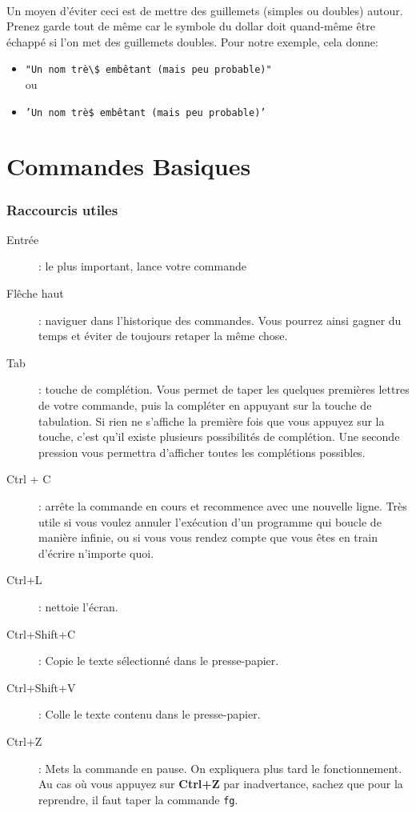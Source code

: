 \documentclass[french, a4paper, 12pt, titlepage]{article}
\begin{document}
\paragraph{} Un moyen d'éviter ceci est de mettre des guillemets (simples ou
doubles) autour. Prenez garde tout de même car le symbole du dollar doit
quand-même être échappé si l'on met des guillemets doubles. Pour notre exemple,
cela donne:
\\
\begin{itemize}
	\item \texttt{"Un nom trè\textbackslash\$ embêtant (mais peu probable)"}\\
	ou
	\item \texttt{'Un nom trè\$ embêtant (mais peu probable)'}
\end{itemize}

\newpage
\part{Commandes Basiques}

\section{Raccourcis utiles}

\begin{description}
	\item[Entrée]: le plus important, lance votre commande
	\item[Flêche haut]: naviguer dans l'historique des commandes. Vous pourrez
		ainsi gagner du temps et éviter de toujours retaper la même chose.
	\item[Tab]: touche de complétion. Vous permet de taper les quelques
		premières lettres de votre commande, puis la compléter en appuyant sur
		la touche de tabulation. Si rien ne s'affiche la première fois que vous
		appuyez sur la touche, c'est qu'il existe plusieurs possibilités de
		complétion. Une seconde pression vous permettra d'afficher toutes les
		complétions possibles.
	\item[Ctrl + C]: arrête la commande en cours et recommence avec une
		nouvelle ligne. Très utile si vous voulez annuler l'exécution d'un
		programme qui boucle de manière infinie, ou si vous vous rendez compte
		que vous êtes en train d'écrire n'importe quoi.
	\item[Ctrl+L]: nettoie l'écran.
	\item[Ctrl+Shift+C]: Copie le texte sélectionné dans le presse-papier.
	\item[Ctrl+Shift+V]: Colle le texte contenu dans le presse-papier.
	\item[Ctrl+Z]: Mets la commande en pause. On expliquera plus tard le
		fonctionnement. Au cas où vous appuyez sur \textbf{Ctrl+Z} par
		inadvertance, sachez que pour la reprendre, il faut taper la commande
		\texttt{fg}.
\end{description}
\end{document}
